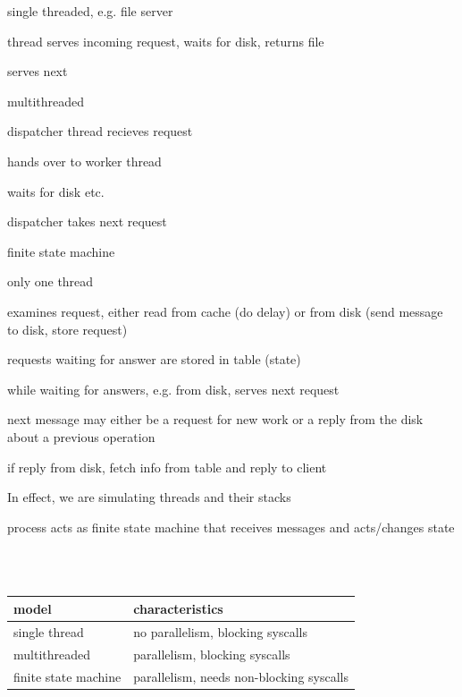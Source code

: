 \begin{compactitem}
	\item single threaded, e.g. file server
	\begin{compactitem}
		\item thread serves incoming request, waits for disk, returns file
		\item serves next
	\end{compactitem}
	\item multithreaded
	\begin{compactitem}
		\item dispatcher thread recieves request
		\item hands over to worker thread
		\item waits for disk etc.
		\item dispatcher takes next request
	\end{compactitem}
	\item finite state machine
	\begin{compactitem}
		\item only one thread
		\item examines request, either read from cache (do delay) or from disk (send message to disk, store request) 
		\item requests waiting for answer are stored in table (state)
		\item while waiting for answers, e.g. from disk, serves next request
		\item next message may either be a request for new work or a reply from the disk about a previous operation
		\item if reply from disk, fetch info from table and reply to client
		\item In effect, we are simulating threads and their stacks
		\item process acts as finite state machine that receives messages and acts/changes state
	\end{compactitem}		
\end{compactitem}
\ \\
\ \\
\begin{tabular}{l | l}
\textbf{model} 		&	\textbf{characteristics} \\ \hline
single thread 		& 	no parallelism, blocking syscalls \\
multithreaded 		&	parallelism, blocking syscalls \\
finite state machine 	&	parallelism, needs non-blocking syscalls \\
\end{tabular}

